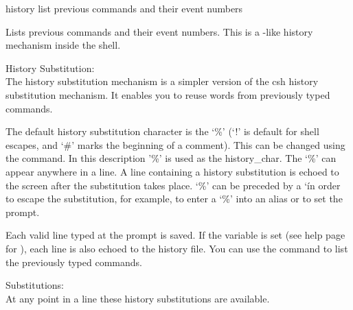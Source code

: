 \begin{nusmvCommand}{history} {list previous commands and their event numbers}

\label{History Command}


Lists previous commands and their event numbers.  This is a \unix-like
history mechanism inside the \nusmv shell.\\

\begin{cmdOpt}
\end{cmdOpt}

History Substitution:\\
  The history substitution mechanism is a simpler version of the csh history
  substitution mechanism.  It enables you to reuse words from previously typed
  commands.

The default history substitution character is the `\%' (`!' is default
for shell escapes, and `\#' marks the beginning of a comment). This
can be changed using the  command. In this description '\%' is
used as the history\_char.  The `\%' can appear anywhere in a line.  A
line containing a history substitution is echoed to the screen after
the substitution takes place.  `\%' can be preceded by a `\' in order
to escape the substitution, for example, to enter a `\%' into an alias
or to set the prompt.

Each valid line typed at the prompt is saved.  If the 
variable is set (see help page for ), each line is also echoed
to the history file.  You can use the  command to list the
previously typed commands. 

Substitutions: \\ At any point in a line these history substitutions
are available.
        
\begin{cmdOpt}








        
\end{cmdOpt}
\end{nusmvCommand}
